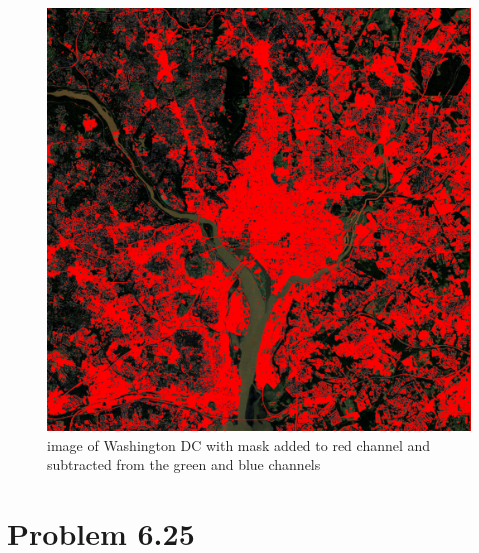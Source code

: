 \documentclass{article}
\begin{document}
	\begin{figure}[H]
		\includegraphics[width=\linewidth]{6.17/partC/washingtonDCBuildings.png}
		\caption{image of Washington DC with mask added to red channel and subtracted from the green and blue channels}
	\end{figure}
	
	\newpage
	\section{Problem 6.25}
\end{document}
